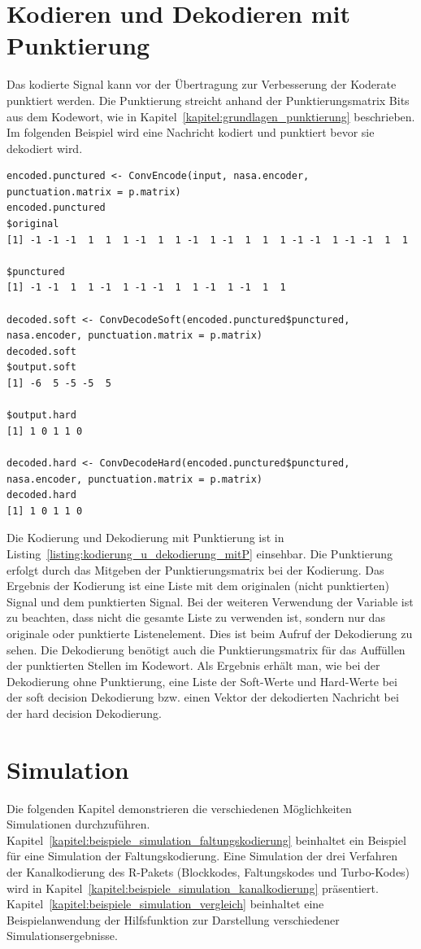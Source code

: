 \section{Kodieren und Dekodieren mit Punktierung}
\label{kapitel:beispiele_kodieren_mitP}
Das kodierte Signal kann vor der Übertragung zur Verbesserung der Koderate punktiert werden. Die Punktierung streicht anhand der Punktierungsmatrix Bits aus dem Kodewort, wie in Kapitel~\ref{kapitel:grundlagen_punktierung} beschrieben. Im folgenden Beispiel wird eine Nachricht kodiert und punktiert bevor sie dekodiert wird.
\begin{lstlisting}[caption=Kodierung und Dekodierung mit Punktierung, label={listing:kodierung_u_dekodierung_mitP}, float=!th]
encoded.punctured <- ConvEncode(input, nasa.encoder, punctuation.matrix = p.matrix)
encoded.punctured
$original
[1] -1 -1 -1  1  1  1 -1  1  1 -1  1 -1  1  1  1 -1 -1  1 -1 -1  1  1

$punctured
[1] -1 -1  1  1 -1  1 -1 -1  1  1 -1  1 -1  1  1

decoded.soft <- ConvDecodeSoft(encoded.punctured$punctured, nasa.encoder, punctuation.matrix = p.matrix)
decoded.soft
$output.soft
[1] -6  5 -5 -5  5

$output.hard
[1] 1 0 1 1 0

decoded.hard <- ConvDecodeHard(encoded.punctured$punctured, nasa.encoder, punctuation.matrix = p.matrix)
decoded.hard
[1] 1 0 1 1 0
\end{lstlisting}
Die Kodierung und Dekodierung mit Punktierung ist in Listing~\ref{listing:kodierung_u_dekodierung_mitP} einsehbar. Die Punktierung erfolgt durch das Mitgeben der Punktierungsmatrix bei der Kodierung. Das Ergebnis der Kodierung ist eine Liste mit dem originalen (nicht punktierten) Signal und dem punktierten Signal. Bei der weiteren Verwendung der Variable ist zu beachten, dass nicht die gesamte Liste zu verwenden ist, sondern nur das originale oder punktierte Listenelement. Dies ist beim Aufruf der Dekodierung zu sehen. Die Dekodierung benötigt auch die Punktierungsmatrix für das Auffüllen der punktierten Stellen im Kodewort. Als Ergebnis erhält man, wie bei der Dekodierung ohne Punktierung, eine Liste der Soft-Werte und Hard-Werte bei der soft decision Dekodierung bzw. einen Vektor der dekodierten Nachricht bei der hard decision Dekodierung.

\section{Simulation}
\label{kapitel:beispiele_simulation}
Die folgenden Kapitel demonstrieren die verschiedenen Möglichkeiten Simulationen durchzuführen. Kapitel~\ref{kapitel:beispiele_simulation_faltungskodierung} beinhaltet ein Beispiel für eine Simulation der Faltungskodierung. Eine Simulation der drei Verfahren der Kanalkodierung des R-Pakets (Blockkodes, Faltungskodes und Turbo-Kodes) wird in Kapitel~\ref{kapitel:beispiele_simulation_kanalkodierung} präsentiert. Kapitel~\ref{kapitel:beispiele_simulation_vergleich} beinhaltet eine Beispielanwendung der Hilfsfunktion zur Darstellung verschiedener Simulationsergebnisse.

